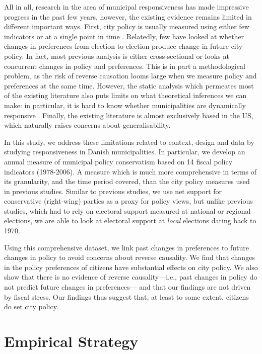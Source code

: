 \documentclass[a4paper,12pt]{article}
\begin{document}
All in all, research in the area of municipal responsiveness has made impressive progress in the past few years, however, the existing evidence remains limited in different important ways. First, city policy is usually measured using either few indicators \citep{sances2017voters,einstein2016pushing} or at a single point in time \citep{tausanovitch2014representation}. Relatedly, few have looked at whether changes in preferences from election to election produce change in future city policy. In fact, most previous analysis is either cross-sectional or looks at concurrent changes in policy and preferences. This is in part a methodological problem, as the risk of reverse causation looms large when we measure policy and preferences at the same time. However, the static analysis which permeates most of the existing literature also puts limits on what theoretical inferences we can make: in particular, it is hard to know whether municipalities are dynamically responsive \citep{stimson1995dynamic}. Finally, the existing literature is almost exclusively based in the US, which naturally raises concerns about generalisability.


In this study, we address these limitations related to context, design and data by studying responsiveness in Danish municipalities. In particular, we develop an annual measure of municipal policy conservatism based on 14 fiscal policy indicators (1978-2006). A measure which is much more comprehensive in terms of its granularity, and the time period covered, than the city policy measures used in previous studies. Similar to previous studies, we use net support for conservative (right-wing) parties as a proxy for policy views, but unlike previous studies, which had to rely on electoral support measured at national or regional elections, we are able to look at electoral support at \textit{local} elections dating back to 1970. 

Using this comprehensive dataset, we link past changes in preferences to future changes in policy to avoid concerns about reverse causality. We find that changes in the policy preferences of citizens have substantial effects on city policy. We also show that there is no evidence of reverse causality---i.e., past changes in policy do not predict future changes in preferences--- and that our findings are not driven by  fiscal stress. Our findings thus suggest that, at least to some extent, citizens do set city policy.


\section*{Empirical Strategy}
\end{document}
